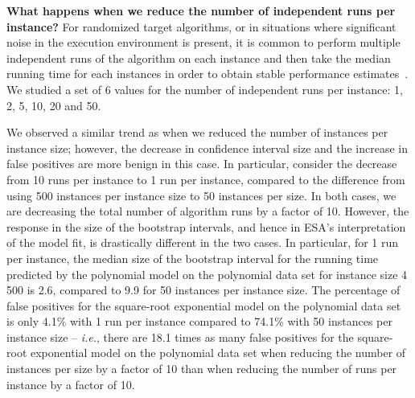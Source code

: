 \documentclass[aic]{iosart2x}
\newcommand{\ie}{\emph{i.e.}}
\begin{document}
\textbf{What happens when we reduce the number of independent runs per instance?}
For randomized target algorithms, or in situations where significant noise in the execution environment is present, it is common to perform multiple independent runs of the algorithm on each instance and then take the median running time for each instances in order to obtain stable performance estimates~\cite{Sun09}.
We studied a set of 6 values for the number of independent runs per instance: 1, 2, 5, 10, 20 and 50. 

We observed a similar trend as when we reduced the number of instances per instance size; however, the decrease in confidence interval size and the increase in false positives are more benign in this case. 
In particular, consider the decrease from 10 runs per instance to 1 run per instance, compared to the difference from using 500 instances per instance size to 50 instances per size. 
In both cases, we are decreasing the total number of algorithm runs by a factor of 10. 
However, the response in the size of the bootstrap intervals, and hence in ESA's interpretation of the model fit, is drastically different in the two cases. 
In particular, for 1 run per instance, the median size of the bootstrap interval for the running time predicted by the polynomial model on the polynomial data set for instance size 4\,500 is 2.6, compared to 9.9 for 50 instances per instance size. 
The percentage of false positives for the square-root exponential model on the polynomial data set is only 4.1\% with 1 run per instance compared to 74.1\% with 50 instances per instance size -- \ie{}, there are 18.1 times as many false positives for the square-root exponential model on the polynomial data set when reducing the number of instances per size by a factor of 10 than when reducing the number of runs per instance by a factor of 10. 
\end{document}
